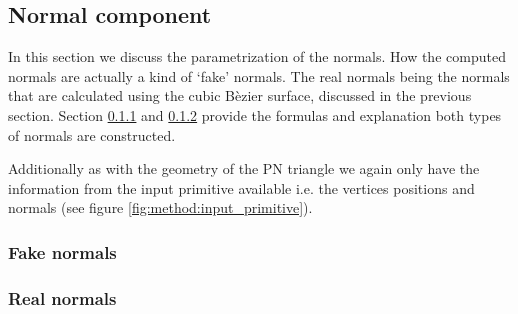 
\subsection{Normal component}\label{ss:normal_component}
In this section we discuss the parametrization of the normals. How the computed normals are actually a kind of `fake' normals. The real normals being the normals that are calculated using the cubic B\`ezier surface, discussed in the previous section. Section \ref{sss:method:normals:fakeNormals} and \ref{sss:method:normals:realNormals} provide the formulas and explanation both types of normals are constructed.

Additionally as with the geometry of the PN triangle we again only have the information from the input primitive available i.e. the vertices positions and normals (see figure \ref{fig:method:input_primitive}).



\subsubsection{Fake normals}


\label{sss:method:normals:fakeNormals}

\subsubsection{Real normals}
\label{sss:method:normals:realNormals}
